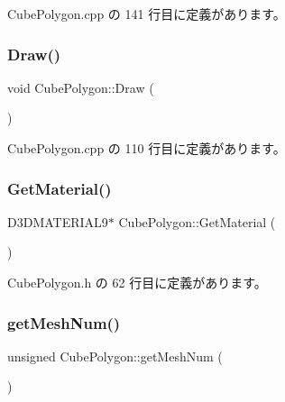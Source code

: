  Cube\+Polygon.\+cpp の 141 行目に定義があります。

\mbox{\label{class_cube_polygon_ac9003cd00eea402f2b6c5fb5a77feae2}} 
\subsubsection{\texorpdfstring{Draw()}{Draw()}}
{\footnotesize\ttfamily void Cube\+Polygon\+::\+Draw (\begin{DoxyParamCaption}{ }\end{DoxyParamCaption})}



 Cube\+Polygon.\+cpp の 110 行目に定義があります。

\mbox{\label{class_cube_polygon_a6bd49d47a58c9c89a1ddaee37f7f4d22}} 
\subsubsection{\texorpdfstring{Get\+Material()}{GetMaterial()}}
{\footnotesize\ttfamily D3\+D\+M\+A\+T\+E\+R\+I\+A\+L9$\ast$ Cube\+Polygon\+::\+Get\+Material (\begin{DoxyParamCaption}{ }\end{DoxyParamCaption})\hspace{0.3cm}{\ttfamily [inline]}}



 Cube\+Polygon.\+h の 62 行目に定義があります。

\mbox{\label{class_cube_polygon_a50970957b530b7089487799210b14903}} 
\subsubsection{\texorpdfstring{get\+Mesh\+Num()}{getMeshNum()}}
{\footnotesize\ttfamily unsigned Cube\+Polygon\+::get\+Mesh\+Num (\begin{DoxyParamCaption}{ }\end{DoxyParamCaption})\hspace{0.3cm}{\ttfamily [inline]}}



